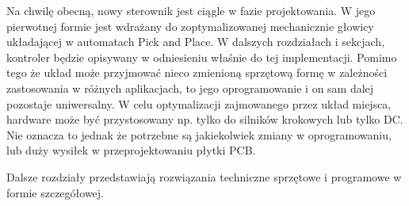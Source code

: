 Na chwilę obecną, nowy sterownik jest ciągle w fazie projektowania. W jego pierwotnej formie jest wdrażany do zoptymalizowanej mechanicznie głowicy układającej w automatach Pick and Place. W dalszych rozdziałach i sekcjach, kontroler będzie opisywany w odniesieniu właśnie do tej implementacji. Pomimo tego że układ może przyjmować nieco zmienioną sprzętową formę w zależności zastosowania w różnych aplikacjach, to jego oprogramowanie i on sam dalej pozostaje uniwersalny. W celu optymalizacji zajmowanego przez układ miejsca, hardware może być przystosowany np. tylko do silników krokowych lub tylko DC. Nie oznacza to jednak że potrzebne są jakiekolwiek zmiany w oprogramowaniu, lub duży wysiłek w przeprojektowaniu płytki PCB. 

Dalsze rozdziały przedstawiają rozwiązania techniczne sprzętowe i programowe w formie szczegółowej.

\clearpage



